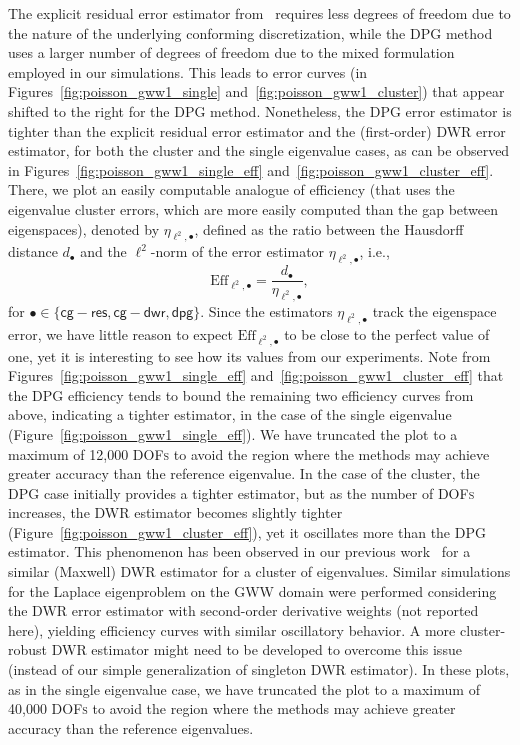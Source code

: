 \documentclass[12pt, oneside, reqno]{amsart}
\theoremstyle{remark}
\begin{document}
The explicit residual error estimator
from~\cite{Lar2000-1} requires less degrees of freedom due to the nature of the
underlying conforming discretization, while the DPG method uses a larger
number of degrees of freedom due to the mixed formulation employed in our
simulations.
This leads to error curves
(in Figures~\ref{fig:poisson_gww1_single} and~\ref{fig:poisson_gww1_cluster})
that appear shifted to the right for the DPG method.
Nonetheless, the DPG error estimator is tighter than the explicit residual
error estimator and the (first-order) DWR error estimator, for both the cluster
and the single eigenvalue cases, as can be observed
in Figures~\ref{fig:poisson_gww1_single_eff} and~\ref{fig:poisson_gww1_cluster_eff}. There,
we plot an easily computable analogue of efficiency
(that uses the eigenvalue cluster errors, which are more easily computed than
the gap between eigenspaces),
denoted by \(\eta_{\ell^2, \bullet}\), defined 
as the ratio between the Hausdorff distance \(d_{\bullet}\) and the
\(\ell^2\)-norm of the error estimator \(\eta_{\ell^2, \bullet}\),
i.e.,
\begin{equation*}
  \text{Eff}_{\ell^2, \bullet}
  = \frac{d_{\bullet}}{\eta_{\ell^2, \bullet}},
\end{equation*}
for \(\bullet \in \{\mathsf{cg-res}, \mathsf{cg-dwr}, \mathsf{dpg}\}\).
Since the estimators $\eta_{\ell^2, \bullet}$ track the eigenspace error,
we have little reason to expect $\text{Eff}_{\ell^2, \bullet}$
to be close to the perfect value of one, yet it is interesting to see
how its values from our experiments.
Note from
Figures~\ref{fig:poisson_gww1_single_eff} and~\ref{fig:poisson_gww1_cluster_eff}
that the DPG efficiency tends to bound the remaining two efficiency
curves from above, indicating a tighter estimator, in the case of the
single eigenvalue (Figure~\ref{fig:poisson_gww1_single_eff}).
We have truncated the plot to a
maximum of 12,000 \textsc{DOFs} to avoid the region where the methods
may achieve greater accuracy than the reference eigenvalue.
In the case of the cluster, the DPG case initially provides a tighter estimator,
but as the number of \textsc{DOFs} increases, the DWR estimator becomes
slightly tighter (Figure~\ref{fig:poisson_gww1_cluster_eff}), yet it oscillates
more than the DPG estimator.
This phenomenon has been observed in our previous
work~\cite{GopGroPinVan2025-1} for a similar (Maxwell) DWR estimator for
a cluster of eigenvalues. 
Similar simulations for the Laplace eigenproblem on the GWW domain
were performed considering the DWR error estimator with second-order derivative
weights (not reported here), yielding efficiency curves
with similar oscillatory behavior.
A more cluster-robust DWR estimator might need to be developed
to overcome this issue (instead of our simple generalization of singleton 
DWR estimator).
In these plots, as in the single eigenvalue case, we have truncated the plot to a
maximum of 40,000 \textsc{DOFs} to avoid the region where the methods may 
achieve greater accuracy than the reference eigenvalues.
\end{document}
